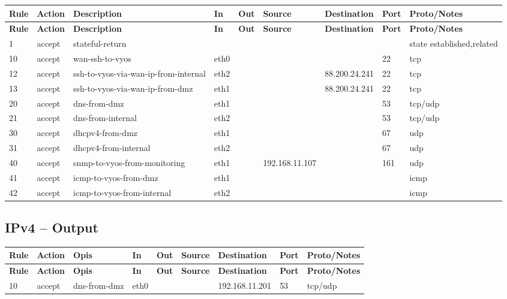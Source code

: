 \documentclass[a4paper,11pt]{article}
\begin{document}
\begin{landscape}
\begin{longtable}{|l|l|l|l|l|l|l|p{2.2cm}|l|}
\hline
\textbf{Rule} & \textbf{Action} & \textbf{Description} & \textbf{In} & \textbf{Out} & \textbf{Source} & \textbf{Destination} & \textbf{Port} & \textbf{Proto/Notes} \\
\hline
\endfirsthead
\hline
\textbf{Rule} & \textbf{Action} & \textbf{Description} & \textbf{In} & \textbf{Out} & \textbf{Source} & \textbf{Destination} & \textbf{Port} & \textbf{Proto/Notes} \\
\hline
\endhead
1 & accept & stateful-return & & & & & & state established,related \\
10 & accept & wan-ssh-to-vyos & eth0 &  &  &  & 22 & tcp \\
12 & accept & ssh-to-vyos-via-wan-ip-from-internal & eth2 &  &  & 88.200.24.241 & 22 & tcp \\
13 & accept & ssh-to-vyos-via-wan-ip-from-dmz & eth1 &  &  & 88.200.24.241 & 22 & tcp \\
20 & accept & dns-from-dmz & eth1 &  &  &  & 53 & tcp/udp \\
21 & accept & dns-from-internal & eth2 &  &  &  & 53 & tcp/udp \\
30 & accept & dhcpv4-from-dmz & eth1 &  &  &  & 67 & udp \\
31 & accept & dhcpv4-from-internal & eth2 &  &  &  & 67 & udp \\
40 & accept & snmp-to-vyos-from-monitoring & eth1 &  & 192.168.11.107 & & 161 & udp \\
41 & accept & icmp-to-vyos-from-dmz & eth1 &  &  &  &  & icmp \\
42 & accept & icmp-to-vyos-from-internal & eth2 &  &  &  &  & icmp \\
\hline
\end{longtable}

\subsection{IPv4 -- Output}
\begin{longtable}{|l|l|l|l|l|l|l|p{2.2cm}|l|}
\hline
\textbf{Rule} & \textbf{Action} & \textbf{Opis} & \textbf{In} & \textbf{Out} & \textbf{Source} & \textbf{Destination} & \textbf{Port} & \textbf{Proto/Notes} \\
\hline
\endfirsthead
\hline
\textbf{Rule} & \textbf{Action} & \textbf{Opis} & \textbf{In} & \textbf{Out} & \textbf{Source} & \textbf{Destination} & \textbf{Port} & \textbf{Proto/Notes} \\
\hline
\endhead
10 & accept & dns-from-dmz & eth0 &  &  & 192.168.11.201 & 53 & tcp/udp \\
\hline
\end{longtable}


\end{landscape}
\end{document}
